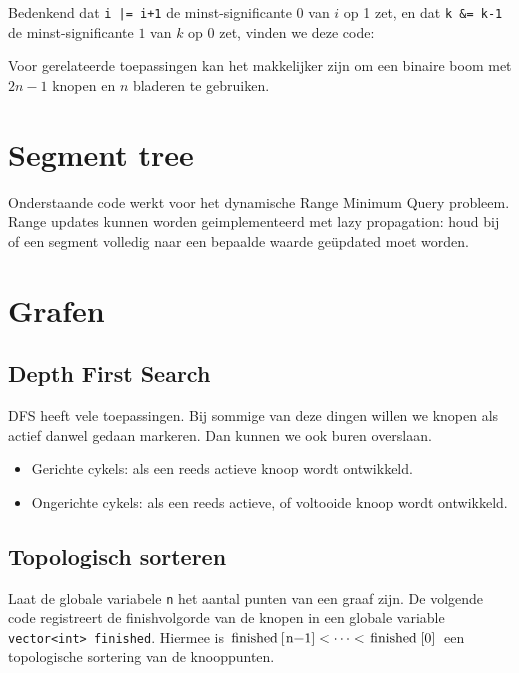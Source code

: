 \documentclass[10pt,a4paper,titlepage]{article}
\begin{document}
Bedenkend dat \lstinline{i |= i+1} de minst-significante 0 van $i$ op 1 zet, en dat \lstinline{k &= k-1} de minst-significante $1$ van $k$ op 0 zet, vinden we deze code:


Voor gerelateerde toepassingen kan het makkelijker zijn om een binaire boom met $2n-1$ knopen en $n$ bladeren te gebruiken.
\fi

\section{Segment tree}
Onderstaande code werkt voor het dynamische Range Minimum Query probleem. Range updates kunnen worden geimplementeerd met lazy propagation: houd bij of een segment volledig naar een bepaalde waarde ge\"updated moet worden.



\section{Grafen}

\subsection{Depth First Search}

DFS heeft vele toepassingen. Bij sommige van deze dingen willen we knopen als actief danwel gedaan markeren. Dan kunnen we ook buren overslaan.
\begin{itemize}[noitemsep,nolistsep]
\item Gerichte cykels: als een reeds actieve knoop wordt ontwikkeld.
\item Ongerichte cykels: als een reeds actieve, of voltooide knoop wordt ontwikkeld.
\end{itemize}

\subsection{Topologisch sorteren}

Laat de globale variabele \texttt{n} het aantal punten van een graaf zijn.
De volgende code registreert de finishvolgorde van de knopen in een globale variable \lstinline{vector<int> finished}. Hiermee is $\text{\lstinline{finished[n-1]}} < \cdots < \text{\lstinline{finished[0]}}$ een topologische sortering van de knooppunten.

\end{document}
